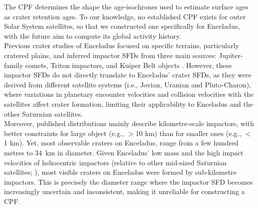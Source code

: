 \documentclass[preprint,12pt,3p,times,authoryear]{elsarticle}
\begin{document}
The CPF determines the shape the age-isochrones used to estimate surface ages as crater retention ages. To our knowledge, no established CPF exists for outer Solar System satellites, so that we constructed one specifically for Enceladus, with the future aim to compute its global activity history. \\

Previous crater studies of Enceladus focused on specific terrains, particularly cratered plains, and inferred impactor SFDs from three main sources: Jupiter-family comets, Triton impactors, and Kuiper Belt objects \citep{Zahnle2003, Singer2019, Bottke2024}. However, these impactor SFDs do not directly translate to Enceladus' crater SFDs, as they  were derived from different satellite systems (i.e., Jovian, Uranian and Pluto-Charon), where variations in planetary encounter velocities and collision velocities with the satellites affect crater formation, limiting their applicability to Enceladus and the other Saturnian satellites. \\

Moreover, published distributions mainly describe kilometre-scale impactors, with better constraints for large object (e.g., $>$10 km) than for smaller ones (e.g., $<$1 km). Yet, most observable craters on Enceladus, range from a few hundred metres to 34~km in diameter. Given Enceladus’ low mass and the high impact velocities of heliocentric impactors (relative to other mid-sized Saturnian satellites; \citealt{Zahnle2003, Wong2021}), most visible craters on Enceladus were formed by sub-kilometre impactors. This is precisely the diameter range where the impactor SFD becomes increasingly uncertain and inconsistent, making it unreliable for constructing a CPF. \\
\end{document}
